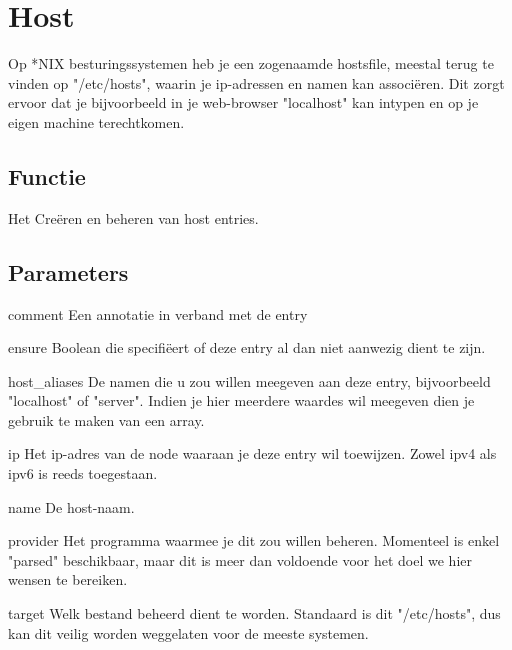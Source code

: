 \section{Host}
Op *NIX besturingssystemen heb je een zogenaamde hostsfile, meestal terug te vinden op "/etc/hosts", waarin je ip-adressen en namen kan associ\"{e}ren. Dit zorgt ervoor dat je bijvoorbeeld in je web-browser "localhost" kan intypen en op je eigen machine terechtkomen.

\subsection{Functie}
Het Cre\"{e}ren en beheren van host entries.

\subsection{Parameters}
comment
Een annotatie in verband met de entry

ensure
Boolean die specifi\"{e}ert of deze entry al dan niet aanwezig dient te zijn.

host\_aliases
De namen die u zou willen meegeven aan deze entry, bijvoorbeeld "localhost" of "server". Indien je hier meerdere waardes wil meegeven dien je gebruik te maken van een array.

ip
Het ip-adres van de node waaraan je deze entry wil toewijzen. Zowel ipv4 als ipv6 is reeds toegestaan.

name
De host-naam.

provider
Het programma waarmee je dit zou willen beheren. Momenteel is enkel "parsed" beschikbaar, maar dit is meer dan voldoende voor het doel we hier wensen te bereiken.

target
Welk bestand beheerd dient te worden. Standaard is dit "/etc/hosts", dus kan dit veilig worden weggelaten voor de meeste systemen.
